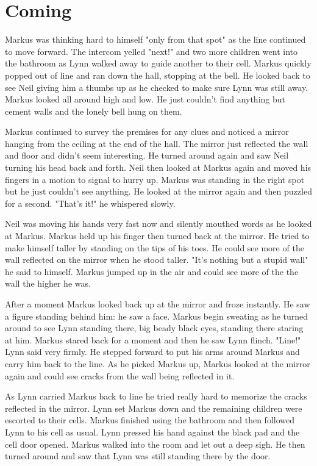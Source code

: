 \documentclass[12pt]{book}
\begin{document}
\chapter{Coming}

Markus was thinking hard to himself "only from that spot" as the line continued to move forward. The intercom yelled "next!" and two more children went into the bathroom as Lynn walked away to guide another to their cell. Markus quickly popped out of line and ran down the hall, stopping at the bell. He looked back to see Neil giving him a thumbs up as he checked to make sure Lynn was still away. Markus looked all around high and low. He just couldn't find anything but cement walls and the lonely bell hung on them.

Markus continued to survey the premises for any clues and noticed a mirror hanging from the ceiling at the end of the hall. The mirror just reflected the wall and floor and didn't seem interesting. He turned around again and saw Neil turning his head back and forth. Neil then looked at Markus again and moved his fingers in a motion to signal to hurry up. Markus was standing in the right spot but he just couldn't see anything. He looked at the mirror again and then puzzled for a second. "That's it!" he whispered slowly.

Neil was moving his hands very fast now and silently mouthed words as he looked at Markus. Markus held up his finger then turned back at the mirror. He tried to make himself taller by standing on the tips of his toes. He could see more of the wall reflected on the mirror when he stood taller. "It's nothing but a stupid wall" he said to himself. Markus jumped up in the air and could see more of the the wall the higher he was.

After a moment Markus looked back up at the mirror and froze instantly. He saw a figure standing behind him: he saw a face. Markus begin sweating as he turned around to see Lynn standing there, big beady black eyes, standing there staring at him. Markus stared back for a moment and then he saw Lynn flinch. "Line!" Lynn said very firmly. He stepped forward to put his arms around Markus and carry him back to the line. As he picked Markus up, Markus looked at the mirror again and could see cracks from the wall being reflected in it.

As Lynn carried Markus back to line he tried really hard to memorize the cracks reflected in the mirror. Lynn set Markus down and the remaining children were escorted to their cells. Markus finished using the bathroom and then followed Lynn to his cell as usual. Lynn pressed his hand against the black pad and the cell door opened. Markus walked into the room and let out a deep sigh. He then turned around and saw that Lynn was still standing there by the door.
\end{document}
